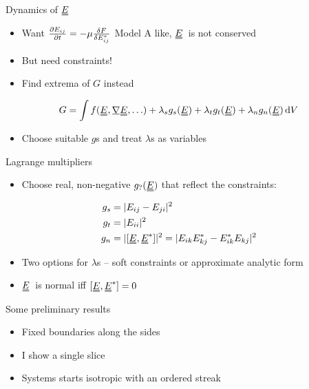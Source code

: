 \documentclass[10pt,notes]{beamer}
\newcommand{\suf}[2]{\stackunder[0.5pt]{\stackunder[1pt]{\ensuremath{#1}}{\rule{\widthof{\ensuremath{#2}}*\real{0.9}}{.1ex}}}{}}
\newcommand{\duf}[2]{\stackunder[0.5pt]{\stackunder[0.8pt]{\stackunder[1pt]{\ensuremath{#1}}{\rule{\widthof{\ensuremath{#2}}*\real{0.9}}{.1ex}}}{\rule{\widthof{\ensuremath{#2}}*\real{0.9}}{.1ex}}}{}}
\newcommand{\su}[1]{\suf{#1}{#1}}
\newcommand{\du}[1]{\duf{#1}{#1}}
\newcommand{\EE}{\ensuremath{\du{E}}}
\begin{document}
\begin{frame}[fragile]{Dynamics of \EE}
    \newrefsection
    \begin{itemize}
        \item Want $\pdv{E_{ij}}{t} = -\mu\fdv{F}{E_{ij}^*}$ \color{gray} Model A like, \EE\ is not conserved \normalcolor
        \item But need constraints!
        \item Find extrema of $G$ instead
    \end{itemize}
    \begin{align*}
        G = \int f(\du{E}, \su{\nabla}\du{E}, \ldots) + \lambda_s g_s(\du{E}) + \lambda_t g_t(\du{E}) + \lambda_n g_n(\du{E}) \dd{V}
    \end{align*}
    \begin{itemize}
        \item Choose suitable $g$s and treat $\lambda$s as variables
    \end{itemize}
\end{frame}

\begin{frame}[fragile]{Lagrange multipliers}
    \newrefsection
    \begin{itemize}
        \item Choose real, non-negative $g_?(\du{E})$ that reflect the constraints:
    \end{itemize}
    \begin{align*}
        g_s &= |E_{ij} - E_{ji}|^2 \\
        g_t &= |E_{ii}|^2 \\
        g_n &= |[\du{E}, \du{E}^*]|^2 = |E_{ik}E_{kj}^* - E_{ik}^*E_{kj}|^2
    \end{align*}
    \begin{itemize}
        \item Two options for $\lambda$s -- soft constraints or approximate analytic form
        \item \color{gray} \EE\ is normal iff $[\du{E}, \du{E}^*] = 0$ \normalcolor
    \end{itemize}
\end{frame}

\begin{frame}[fragile]{Some preliminary results}
    \newrefsection
    \begin{itemize}
        \item Fixed boundaries along the sides
        \item I show a single slice
        \item Systems starts isotropic with an ordered streak
    \end{itemize}
\end{frame}
\end{document}
